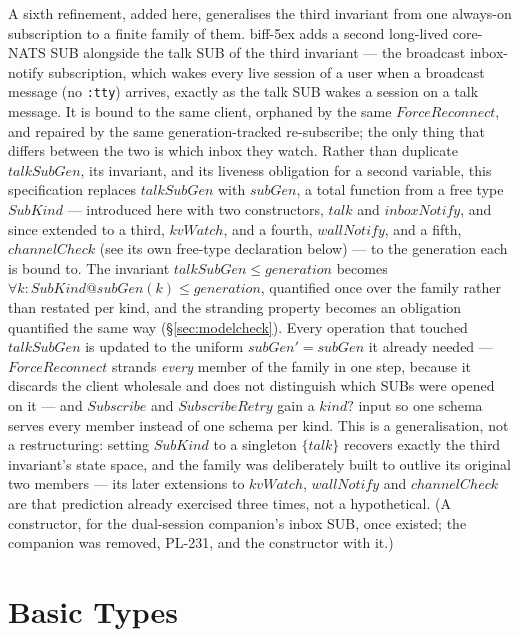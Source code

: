 \documentclass[a4paper,10pt,fleqn]{article}
\begin{document}
A sixth refinement, added here, generalises the third invariant from one
always-on subscription to a finite family of them.  biff-5ex adds a second
long-lived core-NATS SUB alongside the talk SUB of the third
invariant --- the broadcast inbox-notify subscription, which wakes every
live session of a user when a broadcast message (no \texttt{:tty}) arrives,
exactly as the talk SUB wakes a session on a talk message.  It is bound to
the same client, orphaned by the same $ForceReconnect$, and repaired by the
same generation-tracked re-subscribe; the only thing that differs between
the two is which inbox they watch.  Rather than duplicate $talkSubGen$,
its invariant, and its liveness obligation for a second variable, this
specification replaces $talkSubGen$ with $subGen$, a total function from a
free type $SubKind$ --- introduced here with two constructors, $talk$ and
$inboxNotify$, and since extended to a third, $kvWatch$, and a fourth,
$wallNotify$, and a fifth, $channelCheck$ (see its own free-type declaration below) --- to the generation each is bound to.  The
invariant $talkSubGen \leq generation$ becomes $\forall k : SubKind @
subGen(k) \leq generation$, quantified once over the family rather than
restated per kind, and the stranding property becomes an obligation
quantified the same way (\S\ref{sec:modelcheck}).  Every operation that
touched $talkSubGen$ is updated to the uniform $subGen' = subGen$ it
already needed --- $ForceReconnect$ strands \emph{every} member of the
family in one step, because it discards the client wholesale and does not
distinguish which SUBs were opened on it --- and $Subscribe$ and
$SubscribeRetry$ gain a $kind?$ input so one schema serves every member
instead of one schema per kind.  This is a generalisation, not a
restructuring: setting $SubKind$ to a singleton $\{ talk \}$ recovers
exactly the third invariant's state space, and the family was
deliberately built to outlive its original two members --- its later
extensions to $kvWatch$, $wallNotify$ and $channelCheck$ are that prediction already
exercised three times, not a hypothetical.  (A constructor, for the dual-session
companion's inbox SUB, once existed; the companion was removed, PL-231,
and the constructor with it.)

\section{Basic Types}
\end{document}
